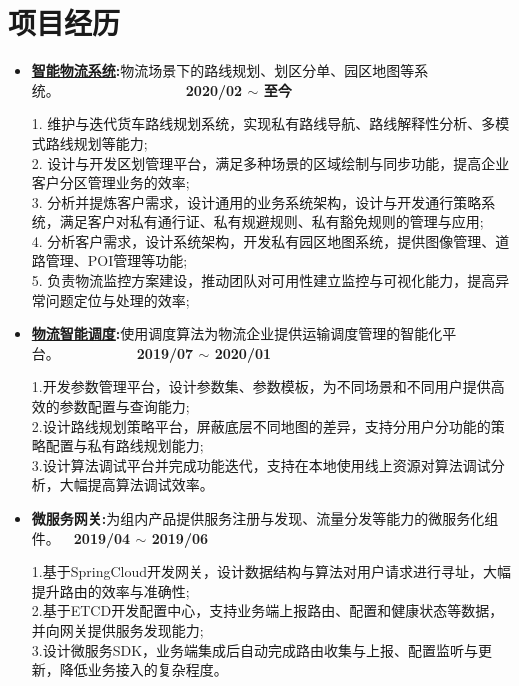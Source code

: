 \documentclass[letterpaper, UTF8, 11pt]{article}
\begin{document}
	\section*{\textbf{项目经历}}\vspace{-0.15in}
	\begin{itemize}	
		\item \textbf{\href{https://lbsyun.baidu.com/solutions/logisticsmap}{智能物流系统}:}{物流场景下的路线规划、划区分单、园区地图等系统。}~~~~~~~~~~~~~~~~~~\textbf{2020/02 $\sim$ 至今}
		
		1. 维护与迭代货车路线规划系统，实现私有路线导航、路线解释性分析、多模式路线规划等能力;\\
		2. 设计与开发区划管理平台，满足多种场景的区域绘制与同步功能，提高企业客户分区管理业务的效率;\\
		3. 分析并提炼客户需求，设计通用的业务系统架构，设计与开发通行策略系统，满足客户对私有通行证、私有规避规则、私有豁免规则的管理与应用;\\
		4. 分析客户需求，设计系统架构，开发私有园区地图系统，提供图像管理、道路管理、POI管理等功能;\\
		5. 负责物流监控方案建设，推动团队对可用性建立监控与可视化能力，提高异常问题定位与处理的效率;\\
		
		
		\vspace{0.04in}

		\item \textbf{\href{https://lbsyun.baidu.com/solutions/scheduling}{物流智能调度}:}{使用调度算法为物流企业提供运输调度管理的智能化平台。}~~~~~~~~~~~\textbf{2019/07 $\sim$ 2020/01}
		
		1.开发参数管理平台，设计参数集、参数模板，为不同场景和不同用户提供高效的参数配置与查询能力;\\
		2.设计路线规划策略平台，屏蔽底层不同地图的差异，支持分用户分功能的策略配置与私有路线规划能力;\\
		3.设计算法调试平台并完成功能迭代，支持在本地使用线上资源对算法调试分析，大幅提高算法调试效率。
		
		\vspace{0.04in}

		\item \textbf{微服务网关:}{为组内产品提供服务注册与发现、流量分发等能力的微服务化组件。}~~\textbf{2019/04 $\sim$ 2019/06}
		
		1.基于SpringCloud开发网关，设计数据结构与算法对用户请求进行寻址，大幅提升路由的效率与准确性;\\
		2.基于ETCD开发配置中心，支持业务端上报路由、配置和健康状态等数据，并向网关提供服务发现能力;\\
		3.设计微服务SDK，业务端集成后自动完成路由收集与上报、配置监听与更新，降低业务接入的复杂程度。
		

\end{itemize}
\end{document}
